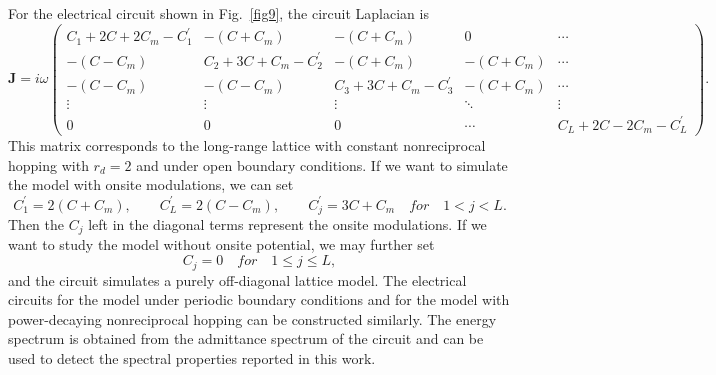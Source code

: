 \documentclass[prb,aps,twocolumn,showpacs]{revtex4-2} %
\begin{document}
\begin{widetext}
For the electrical circuit shown in Fig.~\ref{fig9}, the circuit Laplacian is
\begin{equation}
	\boldsymbol{J}=i\omega 
	\left(
	\begin{array}{ccccc}
		C_1+2C+2C_m-C_1^\prime & -(C+C_m) & -(C+C_m) & 0 & \cdots \\
		-(C-C_m) & C_2+3C+C_m-C_2^\prime & -(C+C_m) & -(C+C_m) & \cdots \\
		-(C-C_m) & -(C-C_m) & C_3+3C+C_m-C_3^\prime & -(C+C_m) & \cdots \\
		\vdots & \vdots & \vdots & \ddots & \vdots \\
		0 & 0 & 0 & \cdots & C_L+2C-2C_m-C_L^\prime
	\end{array}
	\right).
\end{equation}
This matrix corresponds to the long-range lattice with constant nonreciprocal hopping with $r_d=2$ and under open boundary conditions. If we want to simulate the model with onsite modulations, we can set 
\begin{equation}
	 C_1^\prime=2(C+C_m), \qquad C_L^\prime=2(C-C_m), \qquad C_j^\prime=3C+C_m \quad for \quad 1<j<L.
\end{equation}
Then the $C_j$ left in the diagonal terms represent the onsite modulations. If we want to study the model without onsite potential, we may further set
\begin{equation}
	C_j = 0 \quad for \quad 1\leq j \leq  L,
\end{equation}
and the circuit simulates a purely off-diagonal lattice model. The electrical circuits for the model under periodic boundary conditions and for the model with power-decaying nonreciprocal hopping can be constructed similarly. The energy spectrum is obtained from the admittance spectrum of the circuit and can be used to detect the spectral properties reported in this work.
\end{widetext}
\end{document}
